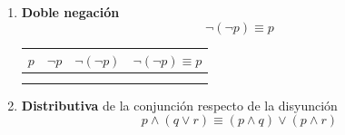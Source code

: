 \begin{enumerate}[label=\alph*)]
\begin{center}
	\renewcommand{\arraystretch}{1.4}
	\begin{tabular}{|c|c||c|}
		\hline
		$p$ & $p \land p$ & $p \land p \equiv p$ \\
		\hline
		\V & \V & \V \\
		\hline
		\F & \F & \V \\
		\hline
	\end{tabular}
	\qquad
	\begin{tabular}{|c|c||c|}
		\hline
		$p$ & $p \vee p$ & $p \vee p \equiv p$ \\
		\hline
		\V & \V & \V \\
		\hline
		\F & \F & \V \\
		\hline
	\end{tabular}
\end{center}

\item \textbf{Doble negación}
\[\lnot(\lnot p) \equiv p\]

\begin{center}
	\renewcommand{\arraystretch}{1.4}
	\begin{tabular}{|c|c|c||c|}
		\hline
		$p$ & $\lnot p$ & $\lnot(\lnot p)$ & $\lnot(\lnot p) \equiv p$ \\
		\hline
		\V & \F & \V & \V \\
		\hline
		\F & \V & \F & \V \\
		\hline
	\end{tabular}
\end{center}

\item \textbf{Distributiva} de la conjunción respecto de la disyunción
\[p \land (q \vee r) \equiv (p \land q) \vee (p \land r)\]


\end{enumerate}

